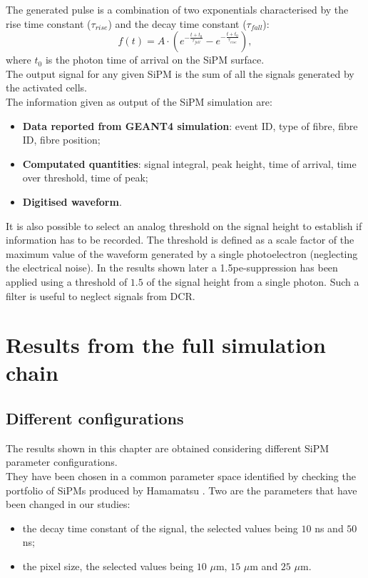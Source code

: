 The generated pulse is a combination of two exponentials characterised by the rise time constant ($\tau_{rise}$) and the decay time constant ($\tau_{fall}$):
\begin{equation}
	f(t)= A \cdot \left( e^{-\frac{t + t_0}{\tau_{fall}}} - e^{-\frac{t + t_0}{\tau_{rise}}}\right),
	\label{form:resp_func}
\end{equation}
where $t_0$ is the photon time of arrival on the SiPM surface.\\
The output signal for any given SiPM is the sum of all the signals generated by the activated cells.\\

The information given as output of the SiPM simulation are:
\begin{itemize}
	\item \textbf{Data reported from GEANT4 simulation}: event ID, type of fibre, fibre ID, fibre position;
	\item \textbf{Computated quantities}: signal integral, peak height, time of arrival, time over threshold, time of peak;
	\item \textbf{Digitised waveform}.
\end{itemize}

It is also possible to select an analog threshold on the signal height to establish if information has to be recorded.
The threshold is defined as a scale factor of the maximum value of the waveform generated by a single photoelectron (neglecting the electrical noise). In the results shown later a 1.5pe-suppression has been applied using a threshold of $1.5$ of the signal height from a single photon. Such a filter is useful to neglect signals from DCR.\\

\section{Results from the full simulation chain} \label{sec:Sim_perf}

\subsection{Different configurations} \label{subsec:SiPM_conf}
The results shown in this chapter are obtained considering different SiPM parameter configurations.\\
They have been chosen in a common parameter space identified by checking the portfolio of SiPMs produced by Hamamatsu \cite{SiPM_lineup}. 
Two are the parameters that have been changed in our studies: 
\begin{itemize}
	\item the decay time constant of the signal, the selected values being $10$ ns and $50$ ns;
	\item the pixel size, the selected values being $10$ $\mu$m, $15$ $\mu$m and $25$ $\mu$m.
\end{itemize}

